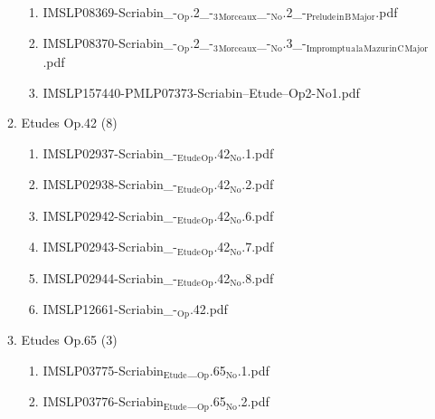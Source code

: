 \documentclass[11pt]{article}
\begin{document}
\begin{enumerate}
\begin{enumerate}
\begin{enumerate}
\item IMSLP08369-Scriabin\_-$_{\text{Op}}$.2\_-$_{\text{3}}$$_{\text{Morceaux}}$\_-$_{\text{No}}$.2\_-$_{\text{Prelude}}$$_{\text{in}}$$_{\text{B}}$$_{\text{Major}}$.pdf
\label{sec-1-1-1-1-44-63-2-1-2}

\item IMSLP08370-Scriabin\_-$_{\text{Op}}$.2\_-$_{\text{3}}$$_{\text{Morceaux}}$\_-$_{\text{No}}$.3\_-$_{\text{Impromptu}}$$_{\text{a}}$$_{\text{la}}$$_{\text{Mazur}}$$_{\text{in}}$$_{\text{C}}$$_{\text{Major}}$.pdf
\label{sec-1-1-1-1-44-63-2-1-3}

\item IMSLP157440-PMLP07373-Scriabin--Etude--Op2-No1.pdf
\label{sec-1-1-1-1-44-63-2-1-4}
\end{enumerate}

\item Etudes Op.42 (8)
\label{sec-1-1-1-1-44-63-2-2}
\begin{enumerate}
\item IMSLP02937-Scriabin\_-$_{\text{Etude}}$$_{\text{Op}}$.42$_{\text{No}}$.1.pdf
\label{sec-1-1-1-1-44-63-2-2-1}

\item IMSLP02938-Scriabin\_-$_{\text{Etude}}$$_{\text{Op}}$.42$_{\text{No}}$.2.pdf
\label{sec-1-1-1-1-44-63-2-2-2}

\item IMSLP02942-Scriabin\_-$_{\text{Etude}}$$_{\text{Op}}$.42$_{\text{No}}$.6.pdf
\label{sec-1-1-1-1-44-63-2-2-3}

\item IMSLP02943-Scriabin\_-$_{\text{Etude}}$$_{\text{Op}}$.42$_{\text{No}}$.7.pdf
\label{sec-1-1-1-1-44-63-2-2-4}

\item IMSLP02944-Scriabin\_-$_{\text{Etude}}$$_{\text{Op}}$.42$_{\text{No}}$.8.pdf
\label{sec-1-1-1-1-44-63-2-2-5}

\item IMSLP12661-Scriabin\_-$_{\text{Op}}$.42.pdf
\label{sec-1-1-1-1-44-63-2-2-6}
\end{enumerate}

\item Etudes Op.65 (3)
\label{sec-1-1-1-1-44-63-2-3}
\begin{enumerate}
\item IMSLP03775-Scriabin$_{\text{Etude}}$\_$_{\text{Op}}$.65$_{\text{No}}$.1.pdf
\label{sec-1-1-1-1-44-63-2-3-1}

\item IMSLP03776-Scriabin$_{\text{Etude}}$\_$_{\text{Op}}$.65$_{\text{No}}$.2.pdf
\label{sec-1-1-1-1-44-63-2-3-2}


\end{enumerate}
\end{enumerate}
\end{enumerate}
\end{document}
